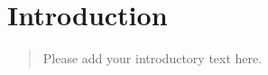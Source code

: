 \chapter{Introduction}
\label{ch: Introduction}

\begin{quotation}
    Please add your introductory text here.
\end{quotation}
